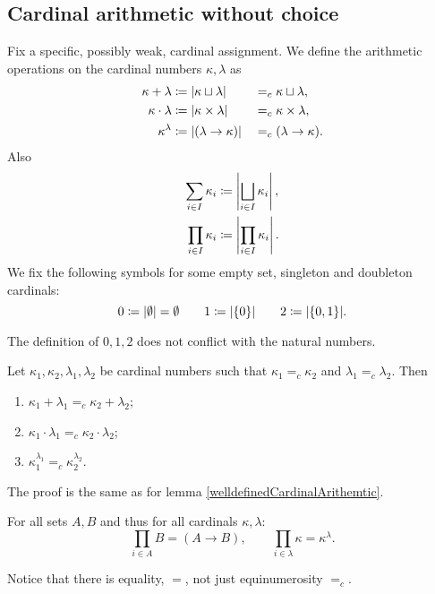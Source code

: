 \subsection{Cardinal arithmetic without choice}
\begin{definition}
Fix a specific, possibly weak, cardinal assignment. We define the arithmetic operations on the cardinal numbers $\kappa, \lambda$ as
\begin{align*}
\kappa + \lambda &\coloneqq |\kappa \sqcup \lambda | & &=_c \kappa \sqcup \lambda, \\
\kappa \cdot \lambda &\coloneqq |\kappa \times \lambda | & &=_c \kappa \times \lambda, \\
\kappa^\lambda &\coloneqq |(\lambda \to \kappa) | & &=_c (\lambda \to \kappa).
\end{align*}
Also
\begin{align*}
\sum_{i\in I}\kappa_i &\coloneqq \left|\bigsqcup_{i\in I}\kappa_i\right|, \\
\prod_{i\in I}\kappa_i &\coloneqq \left| \prod_{i\in I}\kappa_i \right|.
\end{align*}
We fix the following symbols for some empty set, singleton and doubleton cardinals:
\[ 0 \coloneqq |\emptyset|=\emptyset \qquad 1 \coloneqq |\{0\}| \qquad 2\coloneqq |\{0,1\}|.   \]
\end{definition}
The definition of $0,1,2$ does not conflict with the natural numbers.

\begin{lemma}
Let $\kappa_1,\kappa_2,\lambda_1,\lambda_2$ be cardinal numbers such that $\kappa_1=_c \kappa_2$ and $\lambda_1=_c\lambda_2$. Then
\begin{enumerate}
\item $\kappa_1 + \lambda_1 =_c \kappa_2 + \lambda_2$;
\item $\kappa_1 \cdot \lambda_1 =_c \kappa_2\cdot \lambda_2$;
\item $\kappa_1^{\lambda_1} =_c \kappa_2^{\lambda_2}$.
\end{enumerate}
\end{lemma}
The proof is the same as for lemma \ref{welldefinedCardinalArithemtic}.

\begin{lemma}
For all sets $A,B$ and thus for all cardinals $\kappa,\lambda$:
\[ \prod_{i\in A}B = (A\to B), \qquad \prod_{i\in\lambda}\kappa = \kappa^\lambda. \]
\end{lemma}
Notice that there is equality, $=$, not just equinumerosity $=_c$.

